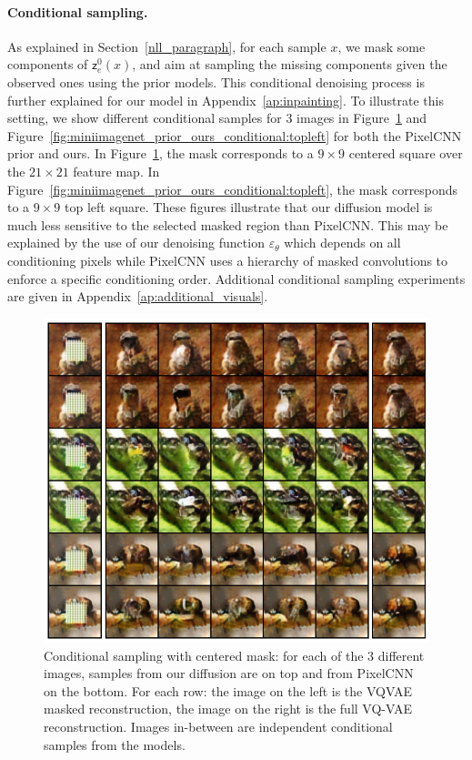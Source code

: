 \documentclass[nohyperref]{article}
\theoremstyle{plain}
\theoremstyle{definition}
\theoremstyle{remark}
\newcommand{\latentcont}{\mathsf{z}_e}
\begin{document}
\paragraph{Conditional sampling. }
As explained in Section~\ref{nll_paragraph},  for each sample $x$,  we mask some components of $\latentcont^0(x)$, and aim at sampling the missing components given the observed ones using the prior models. This conditional denoising process is further explained for our model in Appendix~\ref{ap:inpainting}. To illustrate this setting, we show different conditional samples for 3 images in Figure~\ref{fig:miniimagenet_prior_ours_conditional} and  Figure~\ref{fig:miniimagenet_prior_ours_conditional:topleft}  for both the PixelCNN prior and ours. In Figure~\ref{fig:miniimagenet_prior_ours_conditional},  the mask corresponds to a $9\times 9$ centered square over the $21\times 21$ feature map. In Figure~\ref{fig:miniimagenet_prior_ours_conditional:topleft},  the mask corresponds to a $9\times 9$ top left square. These figures illustrate that our diffusion model is much less sensitive to the selected masked region than PixelCNN. This may be explained by the use of our denoising function $\varepsilon_\theta$ which depends on all conditioning pixels while PixelCNN uses a hierarchy of masked convolutions to enforce
a specific conditioning order. Additional conditional sampling experiments are given in Appendix~\ref{ap:additional_visuals}.

\begin{figure}
    \centering
    \includegraphics[width=\linewidth]{images/ours/cond_samples_center_2.png}

    \caption{Conditional sampling with centered mask: for each of the 3 different images, samples from our diffusion are on top and from PixelCNN on the bottom. For each row: the image on the left is the VQVAE masked reconstruction, the image on the right is the full VQ-VAE reconstruction. Images in-between are independent conditional samples from the models.}
    \label{fig:miniimagenet_prior_ours_conditional}
\end{figure}
\end{document}
